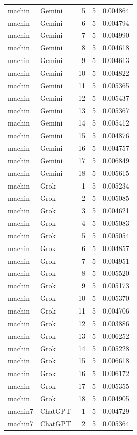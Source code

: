 \begin{longtable}{llrrr}
machin & Gemini & 5 & 5 & 0.004864\\
machin & Gemini & 6 & 5 & 0.004794\\
machin & Gemini & 7 & 5 & 0.004990\\
machin & Gemini & 8 & 5 & 0.004618\\
machin & Gemini & 9 & 5 & 0.004613\\
machin & Gemini & 10 & 5 & 0.004822\\
machin & Gemini & 11 & 5 & 0.005365\\
machin & Gemini & 12 & 5 & 0.005437\\
machin & Gemini & 13 & 5 & 0.005367\\
machin & Gemini & 14 & 5 & 0.005412\\
machin & Gemini & 15 & 5 & 0.004876\\
machin & Gemini & 16 & 5 & 0.004757\\
machin & Gemini & 17 & 5 & 0.006849\\
machin & Gemini & 18 & 5 & 0.005615\\
machin & Grok & 1 & 5 & 0.005234\\
machin & Grok & 2 & 5 & 0.005085\\
machin & Grok & 3 & 5 & 0.004621\\
machin & Grok & 4 & 5 & 0.005083\\
machin & Grok & 5 & 5 & 0.005054\\
machin & Grok & 6 & 5 & 0.004857\\
machin & Grok & 7 & 5 & 0.004951\\
machin & Grok & 8 & 5 & 0.005520\\
machin & Grok & 9 & 5 & 0.005173\\
machin & Grok & 10 & 5 & 0.005370\\
machin & Grok & 11 & 5 & 0.004706\\
machin & Grok & 12 & 5 & 0.003886\\
machin & Grok & 13 & 5 & 0.006252\\
machin & Grok & 14 & 5 & 0.005228\\
machin & Grok & 15 & 5 & 0.006618\\
machin & Grok & 16 & 5 & 0.006172\\
machin & Grok & 17 & 5 & 0.005355\\
machin & Grok & 18 & 5 & 0.004905\\
machin7 & ChatGPT & 1 & 5 & 0.004729\\
machin7 & ChatGPT & 2 & 5 & 0.005364\\

\end{longtable}
